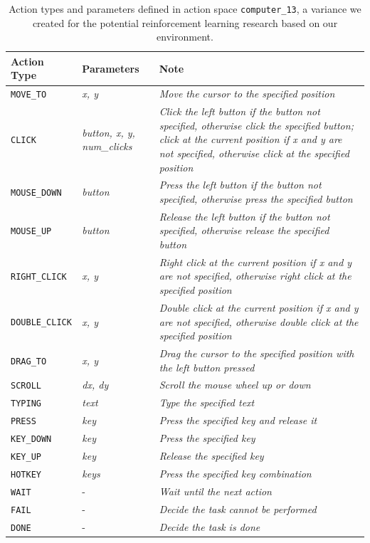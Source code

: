 \begin{table}[ht]
\centering
\caption{Action types and parameters defined in action space \texttt{computer\_13}, a variance we created for the potential reinforcement learning research based on our environment.}
\label{table:action_space}
\begin{tabular}{p{2.4cm}|p{2cm}|p{8.5cm}}
\textbf{Action Type} & \textbf{Parameters} & \textbf{Note} \\
\hline
\texttt{MOVE\_TO} & \textit{x, y} & \textit{Move the cursor to the specified position} \\
\texttt{CLICK} & \textit{button, \newline x, y, \newline num\_clicks} & \textit{Click the left button if the button not specified, otherwise click the specified button; click at the current position if x and y are not specified, otherwise click at the specified position} \\
\texttt{MOUSE\_DOWN} & \textit{button} & \textit{Press the left button if the button not specified, otherwise press the specified button} \\
\texttt{MOUSE\_UP} & \textit{button} & \textit{Release the left button if the button not specified, otherwise release the specified button} \\
\texttt{RIGHT\_CLICK} & \textit{x, y} & \textit{Right click at the current position if x and y are not specified, otherwise right click at the specified position} \\
\texttt{DOUBLE\_CLICK} & \textit{x, y} & \textit{Double click at the current position if x and y are not specified, otherwise double click at the specified position} \\
\texttt{DRAG\_TO} & \textit{x, y} & \textit{Drag the cursor to the specified position with the left button pressed} \\
\texttt{SCROLL} & \textit{dx, dy} & \textit{Scroll the mouse wheel up or down} \\
\texttt{TYPING} & \textit{text} & \textit{Type the specified text} \\
\texttt{PRESS} & \textit{key} & \textit{Press the specified key and release it} \\
\texttt{KEY\_DOWN} & \textit{key} & \textit{Press the specified key} \\
\texttt{KEY\_UP} & \textit{key} & \textit{Release the specified key} \\
\texttt{HOTKEY} & \textit{keys} & \textit{Press the specified key combination} \\
\hline
\texttt{WAIT} & - & \textit{Wait until the next action} \\
\texttt{FAIL} & - & \textit{Decide the task cannot be performed} \\
\texttt{DONE} & - & \textit{Decide the task is done} \\
\end{tabular}
\end{table}


